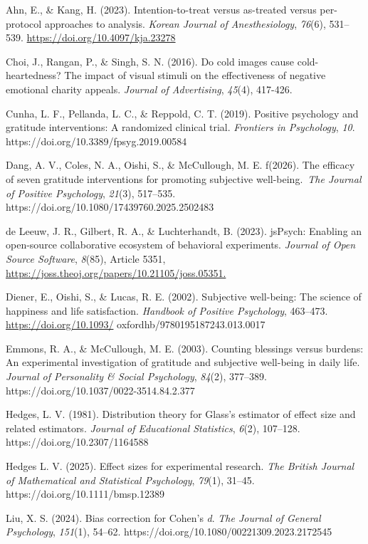 \documentclass[
  letterpaper,
  DIV=11,
  numbers=noendperiod]{scrartcl}
\begin{document}
Ahn, E., \& Kang, H. (2023). Intention-to-treat versus as-treated versus
per-protocol approaches to analysis. \emph{Korean Journal of
Anesthesiology}, \emph{76}(6), 531--539.
\url{https://doi.org/10.4097/kja.23278}

Choi, J., Rangan, P., \& Singh, S. N. (2016). Do cold images cause
cold-heartedness? The impact of visual stimuli on the effectiveness of
negative emotional charity appeals. \emph{Journal of Advertising},
\emph{45}(4), 417-426.

Cunha, L. F., Pellanda, L. C., \& Reppold, C. T. (2019). Positive
psychology and gratitude interventions: A randomized clinical trial.
\emph{Frontiers in Psychology}, \emph{10}.
https://doi.org/10.3389/fpsyg.2019.00584

Dang, A. V., Coles, N. A., Oishi, S., \& McCullough, M. E. f(2026). The
efficacy of seven gratitude interventions for promoting subjective
well-being.~\emph{The Journal of Positive Psychology}, \emph{21}(3),
517--535. https://doi.org/10.1080/17439760.2025.2502483

de Leeuw, J. R., Gilbert, R. A., \& Luchterhandt, B. (2023). jsPsych:
Enabling an open-source collaborative ecosystem of behavioral
experiments. \emph{Journal of Open Source Software}, \emph{8}(85),
Article 5351, \url{https://joss.theoj.org/papers/10.21105/joss.05351.}

Diener, E., Oishi, S., \& Lucas, R. E. (2002). Subjective well-being:
The science of happiness and life satisfaction. \emph{Handbook of
Positive Psychology}, 463--473. \url{https://doi.org/10.1093/}
oxfordhb/9780195187243.013.0017

Emmons, R. A., \& McCullough, M. E. (2003). Counting blessings versus
burdens: An experimental investigation of gratitude and subjective
well-being in daily life. \emph{Journal of Personality \& Social
Psychology}, \emph{84}(2), 377--389.
https://doi.org/10.1037/0022-3514.84.2.377

Hedges, L. V. (1981). Distribution theory for Glass's estimator of
effect size and related estimators. \emph{Journal of Educational
Statistics}, \emph{6}(2), 107--128. https://doi.org/10.2307/1164588

Hedges L. V. (2025). Effect sizes for experimental research. \emph{The
British Journal of Mathematical and Statistical Psychology},
\emph{79}(1), 31--45. https://doi.org/10.1111/bmsp.12389

Liu, X. S. (2024). Bias correction for Cohen's \emph{d}. \emph{The
Journal of General Psychology}, \emph{151}(1), 54--62.
https://doi.org/10.1080/00221309.2023.2172545
\end{document}
